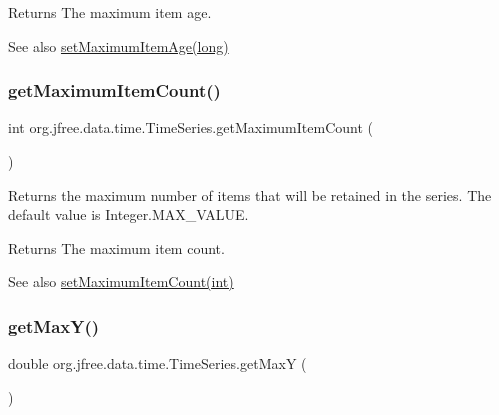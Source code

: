 \begin{DoxyReturn}{Returns}
The maximum item age.
\end{DoxyReturn}
\begin{DoxySeeAlso}{See also}
\mbox{\hyperlink{classorg_1_1jfree_1_1data_1_1time_1_1_time_series_a5bbe512bae71cd45eb54d15a9d4b4a7f}{set\+Maximum\+Item\+Age(long)}} 
\end{DoxySeeAlso}
\mbox{\label{classorg_1_1jfree_1_1data_1_1time_1_1_time_series_abcbd350f6c7bcd4cad3405a457afff4d}} 
\subsubsection{\texorpdfstring{get\+Maximum\+Item\+Count()}{getMaximumItemCount()}}
{\footnotesize\ttfamily int org.\+jfree.\+data.\+time.\+Time\+Series.\+get\+Maximum\+Item\+Count (\begin{DoxyParamCaption}{ }\end{DoxyParamCaption})}

Returns the maximum number of items that will be retained in the series. The default value is {\ttfamily Integer.\+M\+A\+X\+\_\+\+V\+A\+L\+UE}.

\begin{DoxyReturn}{Returns}
The maximum item count.
\end{DoxyReturn}
\begin{DoxySeeAlso}{See also}
\mbox{\hyperlink{classorg_1_1jfree_1_1data_1_1time_1_1_time_series_aa263837dfa3b2b03d6bd7c2da6afe940}{set\+Maximum\+Item\+Count(int)}} 
\end{DoxySeeAlso}
\mbox{\label{classorg_1_1jfree_1_1data_1_1time_1_1_time_series_a7b8dddcabcd0c9e583ea043357d8f30a}} 
\subsubsection{\texorpdfstring{get\+Max\+Y()}{getMaxY()}}
{\footnotesize\ttfamily double org.\+jfree.\+data.\+time.\+Time\+Series.\+get\+MaxY (\begin{DoxyParamCaption}{ }\end{DoxyParamCaption})}

